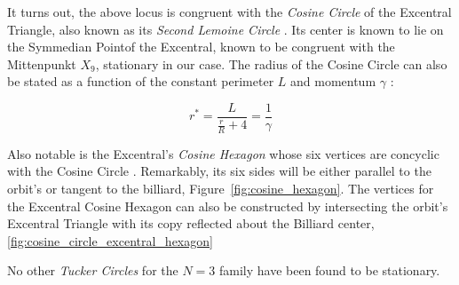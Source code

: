 It turns out, the above locus is congruent with the {\em Cosine Circle} of the Excentral Triangle, also known as its {\em Second Lemoine Circle} \cite{mw}. Its center is known to lie on the Symmedian Pointof the Excentral, known to be congruent with the Mittenpunkt $X_9$, stationary in our case. The radius of the Cosine Circle can also be stated as a function of the constant perimeter $L$ and momentum $\gamma$ \cite{dominique19,sergei19_private_circles}:

\begin{equation}
    r^* = \frac{L}{\frac{r}{R}+4} = \frac{1}{\gamma}
\end{equation}

Also notable is the Excentral's {\em Cosine Hexagon} \cite{mw} whose six vertices are concyclic with the Cosine Circle \cite{mw}. Remarkably, its six sides will be either parallel to the orbit's or tangent to the billiard, Figure~\ref{fig:cosine_hexagon}. The vertices for the Excentral Cosine Hexagon can also be constructed by intersecting the orbit's Excentral Triangle with its copy reflected about the Billiard center, \ref{fig:cosine_circle_excentral_hexagon}

No other {\em Tucker Circles} \cite{mw} for the $N=3$ family have been found to be stationary.

